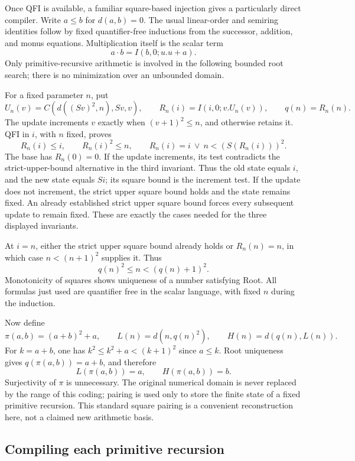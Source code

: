 \documentclass[11pt,letterpaper]{article}
\theoremstyle{definition}\newtheorem{definition}[theorem]{Definition}
\theoremstyle{remark}\newtheorem{remark}[theorem]{Remark}
\begin{document}
Once QFI is available, a familiar square-based injection gives a
particularly direct compiler. Write $a\le b$ for $d(a,b)=0$.
The usual linear-order and semiring identities follow by fixed
quantifier-free inductions from the successor, addition, and monus
equations. Multiplication itself is the scalar term
\[
                        a\cdot b=I(b,0;u.u+a).
\]
Only primitive-recursive arithmetic is involved in the following
bounded root search; there is no minimization over an unbounded domain.

For a fixed parameter $n$, put
\[
 U_n(v)=C(d((Sv)^2,n),Sv,v),\qquad
 R_n(i)=I(i,0;v.U_n(v)),\qquad q(n)=R_n(n).
\]
The update increments $v$ exactly when $(v+1)^2\le n$, and
otherwise retains it. QFI in $i$, with $n$ fixed, proves
\[
 R_n(i)\le i,\qquad R_n(i)^2\le n,\qquad
 R_n(i)=i\ \vee\ n<(S(R_n(i)))^2.              \tag{Root invariant}
\]
The base has $R_n(0)=0$. If the update increments, its test
contradicts the strict-upper-bound alternative in the third invariant.
Thus the old state equals $i$, and the new state equals $Si$;
its square bound is the increment test. If the update does not increment, the
strict upper square bound holds and the state remains fixed.
An already established strict upper square bound forces every
subsequent update to remain fixed. These are exactly the cases
needed for the three displayed invariants.

At $i=n$, either the strict upper square bound already holds or
$R_n(n)=n$, in which case $n<(n+1)^2$ supplies it. Thus
\[
                        q(n)^2\le n<(q(n)+1)^2.           \tag{Root}
\]
Monotonicity of squares shows uniqueness of a number satisfying
Root. All formulas just used are quantifier free in the scalar
language, with fixed $n$ during the induction.

Now define
\[
 \pi(a,b)=(a+b)^2+a,\qquad
 L(n)=d(n,q(n)^2),\qquad H(n)=d(q(n),L(n)).
\]
For $k=a+b$, one has $k^2\le k^2+a<(k+1)^2$ since $a\le k$.
Root uniqueness gives $q(\pi(a,b))=a+b$, and therefore
\[
                    L(\pi(a,b))=a,\qquad H(\pi(a,b))=b.
\]
Surjectivity of $\pi$ is unnecessary. The original numerical domain
is never replaced by the range of this coding; pairing is used only
to store the finite state of a fixed primitive recursion. This
standard square pairing is a convenient reconstruction here, not
a claimed new arithmetic basis.

\subsection{Compiling each primitive recursion}
\end{document}
